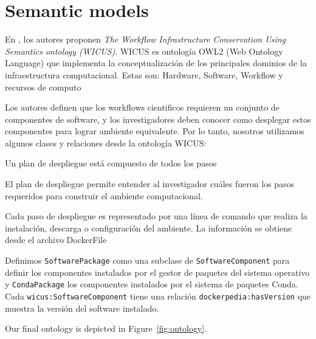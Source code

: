 \section{Semantic models}\label{s4.1}
     
En \cite{santana2017reproducibility}, los autores proponen \emph{The Workflow Infrastructure Conservation Using Semantics ontology (WICUS)}. WICUS es ontología OWL2 (Web Ontology Language) que implementa la conceptualización de los principales dominios de la infraestructura computacional. Estas son: Hardware, Software, Workflow y recursos de computo
     
Los autores definen que los workflows cientificos requieren un conjunto de componentes de software, y los investigadores deben conocer como desplegar estos componentes para lograr ambiente equivalente.
Por lo tanto, nosotros utilizamos algunos clases y relaciones desde la ontología WICUS:

\begin{description}
	\item [DeploymentPlan:]  Un plan de despliegue está compuesto de todos los pasos  
	\item 
	El plan de despliegue permite entender al investigador cuáles fueron los pasos requeridos para construir el ambiente computacional.
	\item [DeploymentStep:] Cada paso de despliegue es representado por una línea de comando que realiza la instalación, descarga o configuración del ambiente. La información se obtiene desde el archivo DockerFile
	\item [ConfigurationInfo:]
	\item [ConfigurationParameter:]  
	\item [SoftwareStack:]
	\item [SoftwareComponent:]
\end{description} 


Definimos \verb|SoftwarePackage| como una subclase de \verb|SoftwareComponent| para definir los componentes instalados por el gestor de paquetes del sistema operativo y \verb|CondaPackage| los componentes instalados por el sistema de paquetes Conda.
Cada \verb|wicus:SoftwareComponent| tiene una relación \verb|dockerpedia:hasVersion| que muestra la versión del software instalado.


Our final ontology is depicted in Figure~\ref{fig:ontology}. 

